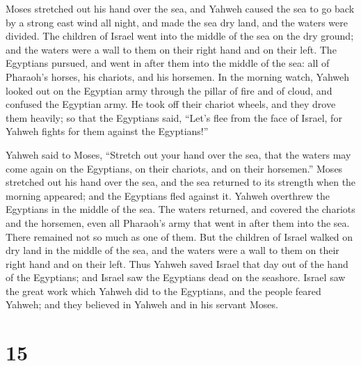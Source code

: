  Moses stretched out his hand over the sea, and Yahweh
caused the sea to go back by a strong east wind all night, and made the
sea dry land, and the waters were divided.  The children of
Israel went into the middle of the sea on the dry ground; and the waters
were a wall to them on their right hand and on their left. 
The Egyptians pursued, and went in after them into the middle of the
sea: all of Pharaoh's horses, his chariots, and his horsemen.
 In the morning watch, Yahweh looked out on the Egyptian
army through the pillar of fire and of cloud, and confused the Egyptian
army.  He took off their chariot wheels, and they drove
them heavily; so that the Egyptians said, ``Let's flee from the face of
Israel, for Yahweh fights for them against the Egyptians!''

 Yahweh said to Moses, ``Stretch out your hand over the
sea, that the waters may come again on the Egyptians, on their chariots,
and on their horsemen.''  Moses stretched out his hand over
the sea, and the sea returned to its strength when the morning appeared;
and the Egyptians fled against it. Yahweh overthrew the Egyptians in the
middle of the sea.  The waters returned, and covered the
chariots and the horsemen, even all Pharaoh's army that went in after
them into the sea. There remained not so much as one of them.
 But the children of Israel walked on dry land in the
middle of the sea, and the waters were a wall to them on their right
hand and on their left.  Thus Yahweh saved Israel that day
out of the hand of the Egyptians; and Israel saw the Egyptians dead on
the seashore.  Israel saw the great work which Yahweh did
to the Egyptians, and the people feared Yahweh; and they believed in
Yahweh and in his servant Moses.

\hypertarget{section-14}{%
\section{15}\label{section-14}}

